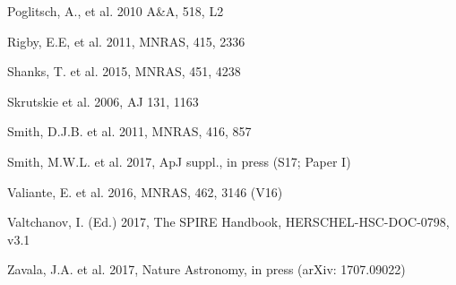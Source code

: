 \documentclass[a4paper,fleqn,usenatbib, twocolumn]{aastex61}
\begin{document}
\begin{thebibliography}{}
 Poglitsch, A., et al. 2010 A\&A, 518, L2

 Rigby, E.E, et al. 2011, MNRAS, 415, 2336 

 Shanks, T. et al. 2015, MNRAS, 451, 4238

 Skrutskie et al. 2006, AJ 131, 1163
  
 Smith, D.J.B. et al. 2011, MNRAS, 
416, 857

 Smith, M.W.L. et al. 2017, ApJ suppl., in press
(S17; Paper I)

 Valiante, E. et al. 2016, MNRAS, 462, 3146
(V16)

 Valtchanov, I. (Ed.) 2017, The SPIRE Handbook, HERSCHEL-HSC-DOC-0798, v3.1 

 Zavala, J.A. et al. 2017, Nature Astronomy,
in press (arXiv: 1707.09022)

\end{thebibliography}
\label{lastpage}
\end{document}
